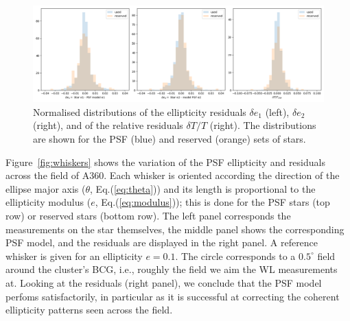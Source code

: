 \documentclass[SE,lsstdraft,authoryear,toc]{lsstdoc}
\begin{document}
\begin{figure}
\includegraphics[width=\textwidth]{Figures/residual_histograms.png}
\caption{Normalised distributions of the ellipticity residuals $\delta e_1$ (left), $\delta e_2$ (right), and of the relative residuals $\delta T/T$ (right). The distributions are shown for the PSF (blue) and reserved (orange) sets of stars. \label{fig:residual_distrib}}
\end{figure}


Figure~\ref{fig:whiskers} shows the variation of the PSF ellipticity and residuals across the field of A360. Each whisker is oriented according the direction of the ellipse major axis ($\theta$, Eq.(\ref{eq:theta})) and its length is proportional to the ellipticity modulus ($e$, Eq.(\ref{eq:modulus})); this is done for the PSF stars (top row) or reserved stars (bottom row). The left panel corresponds the measurements on the star themselves, the middle panel shows the corresponding PSF model, and the residuals are displayed in the right panel. A reference whisker is given for an ellipticity $e = 0.1$. The circle corresponds to a $0.5^\circ$  field around the cluster’s BCG, i.e., roughly the field we aim the WL measurements at. Looking at the residuals (right panel), we conclude that the PSF model perfoms satisfactorily, in particular as it is successful at correcting the coherent ellipticity patterns seen across the field.
\end{document}
